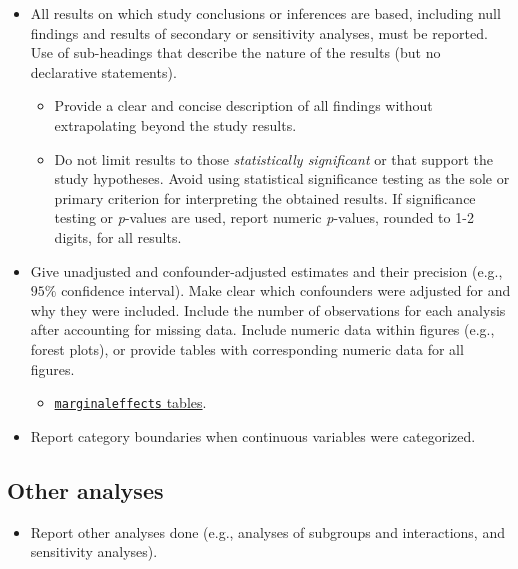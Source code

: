 \documentclass[
  letterpaper,
  DIV=11,
  numbers=noendperiod]{scrartcl}
\providecommand{\tightlist}{%
  \setlength{\itemsep}{0pt}\setlength{\parskip}{0pt}}\usepackage{longtable,booktabs,array}
\begin{document}
\begin{itemize}
\tightlist
\item
  All results on which study conclusions or inferences are based,
  including null findings and results of secondary or sensitivity
  analyses, must be reported. Use of sub-headings that describe the
  nature of the results (but no declarative statements).

  \begin{itemize}
  \tightlist
  \item
    Provide a clear and concise description of all findings without
    extrapolating beyond the study results.
  \item
    Do not limit results to those \emph{statistically significant} or
    that support the study hypotheses. Avoid using statistical
    significance testing as the sole or primary criterion for
    interpreting the obtained results. If significance testing or
    \emph{p}-values are used, report numeric \emph{p}-values, rounded to
    1-2 digits, for all results.
  \end{itemize}
\item
  Give unadjusted and confounder-adjusted estimates and their precision
  (e.g., \(95\%\) confidence interval). Make clear which confounders
  were adjusted for and why they were included. Include the number of
  observations for each analysis after accounting for missing data.
  Include numeric data within figures (e.g., forest plots), or provide
  tables with corresponding numeric data for all figures.

  \begin{itemize}
  \tightlist
  \item
    \href{https://vincentarelbundock.github.io/marginaleffects/articles/tables.html}{\texttt{marginaleffects}
    tables}.
  \end{itemize}
\item
  Report category boundaries when continuous variables were categorized.
\end{itemize}

\subsection{Other analyses}\label{sec-res-other}

\begin{itemize}
\tightlist
\item
  Report other analyses done (e.g., analyses of subgroups and
  interactions, and sensitivity analyses).
\end{itemize}
\end{document}
